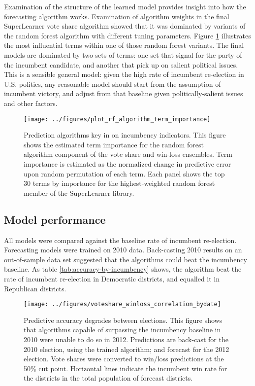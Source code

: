 \documentclass{sig-alternate-2013}
\begin{document}
Examination of the structure of the learned model provides insight
into how the forecasting algorithm works. Examination of algorithm
weights in the final SuperLearner vote share algorithm showed that it
was dominated by variants of the random forest algorithm with
different tuning parameters. Figure \ref{fig:rf-term-importance}
illustrates the most influential terms within one of those random
forest variants. The final models are dominated by two sets of terms:
one set that signal for the party of the incumbent candidate, and
another that pick up on salient political issues. This is a sensible
general model: given the high rate of incumbent re-election in
U.S. politics, any reasonable model should start from the assumption
of incumbent victory, and adjust from that baseline given
politically-salient issues and other factors.

\begin{figure}[ht]
  \centering
  \texttt{[image: ../figures/plot\_rf\_algorithm\_term\_importance]}
  \caption{Prediction algorithms key in on incumbency
    indicators. This figure shows the estimated term importance for the random forest algorithm component
    of the vote share and win-loss ensembles. Term importance is
    estimated as the normalized change in predictive error upon
    random permutation of each term. Each panel shows the top
    30 terms by importance for the highest-weighted random forest
    member of the SuperLearner library.}
  \label{fig:rf-term-importance}
\end{figure}

\subsection{Model performance}
\label{sec:data-acqu-model}

All models were compared against the baseline rate of incumbent
re-election. Forecasting models were trained on 2010 data. Back-casting
2010 results on an out-of-sample data set suggested that the algorithms
could beat the incumbency baseline. As table
\ref{tab:accuracy-by-incumbency} shows, the algorithm beat the rate of
incumbent re-election in Democratic districts, and equalled it in
Republican districts.



\begin{figure}[ht]
  \centering
  \texttt{[image: ../figures/voteshare\_winloss\_correlation\_bydate]}
  \caption{Predictive accuracy degrades between elections. This figure
    shows that algorithms capable of surpassing the incumbency
    baseline in 2010 were unable to do so in 2012. Predictions are back-cast for the 2010 election, using the trained algorithm; and forecast for the 2012 election. Vote shares were converted to win/loss predictions at the 50\% cut point. Horizontal lines indicate the incumbent win rate for the districts in the total population of forecast districts.}
  \label{fig:prediction-corr-bydate}
\end{figure}
\end{document}
